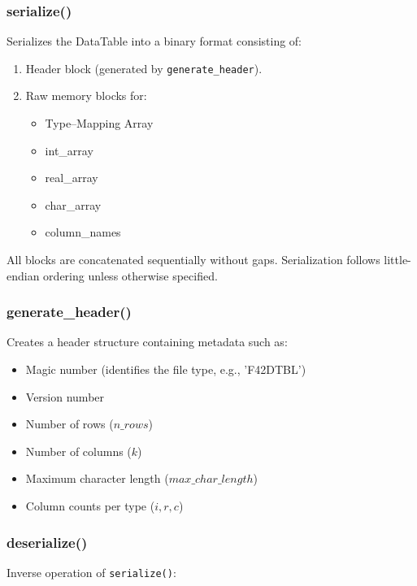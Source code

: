\documentclass{article}
\begin{document}
\subsubsection*{serialize()}

Serializes the DataTable into a binary format consisting of:

\begin{enumerate}
    \item Header block (generated by \texttt{generate\_header}).
    \item Raw memory blocks for:
    \begin{itemize}
        \item Type--Mapping Array
        \item int\_array
        \item real\_array
        \item char\_array
        \item column\_names
    \end{itemize}
\end{enumerate}

All blocks are concatenated sequentially without gaps.
Serialization follows little-endian ordering unless otherwise specified.

\subsubsection*{generate\_header()}

Creates a header structure containing metadata such as:

\begin{itemize}
    \item Magic number (identifies the file type, e.g., 'F42DTBL')
    \item Version number
    \item Number of rows (\( n\_rows \))
    \item Number of columns (\( k \))
    \item Maximum character length (\( max\_char\_length \))
    \item Column counts per type (\( i, r, c \))
\end{itemize}

\subsubsection*{deserialize()}

Inverse operation of \texttt{serialize()}:
\end{document}

